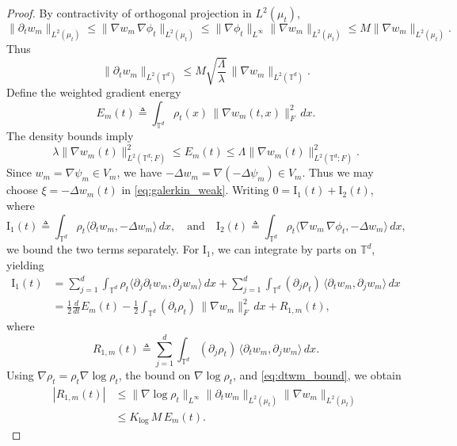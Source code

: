 \documentclass[11pt]{article}
\begin{document}
\begin{proof}
    By contractivity of orthogonal projection in $L^2(\mu_t)$,
    \[
    \|\partial_t w_m\|_{L^2(\mu_t)}
    \le \|\nabla w_m\,\nabla\phi_t\|_{L^2(\mu_t)}
    \le \|\nabla\phi_t\|_{L^\infty}\|\nabla w_m\|_{L^2(\mu_t)}
    \le M\|\nabla w_m\|_{L^2(\mu_t)}.
    \]
    Thus
    \begin{equation}
    \|\partial_t w_m\|_{L^2(\mathbb T^d)}
    \le M\sqrt{\frac{\Lambda}{\lambda}}\,\|\nabla w_m\|_{L^2(\mathbb T^d)}.
    \label{eq:dtwm_bound}
    \end{equation}
    Define the weighted gradient energy
    \[
    E_m(t)\triangleq \int_{\mathbb T^d} \rho_t(x)\,\|\nabla w_m(t,x)\|_F^2\,dx.
    \]
    The density bounds imply
    \begin{equation}
    \lambda \|\nabla w_m(t)\|_{L^2(\mathbb T^d;F)}^2
    \le E_m(t)
    \le \Lambda \|\nabla w_m(t)\|_{L^2(\mathbb T^d;F)}^2.
    \label{eq:Em_equiv}
    \end{equation}
    Since $w_m=\nabla\psi_m \in V_m$, we have $-\Delta w_m = \nabla(-\Delta\psi_m)\in V_m$. Thus we may choose $\xi=-\Delta w_m(t)$ in \cref{eq:galerkin_weak}. Writing $0=\text{I}_1(t)+\text{I}_2(t)$, where
    \[
    \text{I}_1(t)\triangleq \int_{\mathbb T^d}\rho_t \langle \partial_t w_m,-\Delta w_m\rangle\,dx,
    \quad \text{and} \quad
    \text{I}_2(t)\triangleq \int_{\mathbb T^d}\rho_t \langle \nabla w_m\,\nabla\phi_t,-\Delta w_m\rangle\,dx,
    \]
    we bound the two terms separately. For $\text{I}_1$, we can integrate by parts on $\mathbb T^d$, yielding
    \begin{align*}
    \text{I}_1(t)
    &=
    \sum_{j=1}^d \int_{\mathbb T^d}\rho_t \langle \partial_j\partial_t w_m,\partial_j w_m\rangle\,dx
    +
    \sum_{j=1}^d \int_{\mathbb T^d} (\partial_j\rho_t)\,\langle \partial_t w_m,\partial_j w_m\rangle\,dx\\
    &=
    \frac12 \frac{d}{dt} E_m(t)
    -\frac12\int_{\mathbb T^d}(\partial_t\rho_t)\,\|\nabla w_m\|_F^2\,dx
    +
    R_{1,m}(t),
    \end{align*}
    where
    \[
    R_{1,m}(t)\triangleq
    \sum_{j=1}^d \int_{\mathbb T^d} (\partial_j\rho_t)\,\langle \partial_t w_m,\partial_j w_m\rangle\,dx.
    \]
    Using $\nabla\rho_t=\rho_t\nabla\log\rho_t$, the bound on $\nabla\log\rho_t$, and \cref{eq:dtwm_bound}, we obtain
    \begin{align*}
    |R_{1,m}(t)| &\le \|\nabla\log\rho_t\|_{L^\infty}
    \|\partial_t w_m\|_{L^2(\mu_t)}
    \|\nabla w_m\|_{L^2(\mu_t)}\\
    &\le K_{\log}\,M\,E_m(t).
    \end{align*}

\end{proof}
\end{document}
